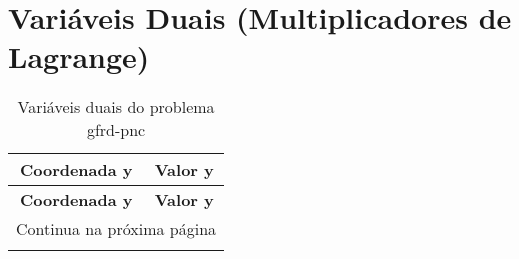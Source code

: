 \documentclass[12pt]{article}
\begin{document}
\section{Variáveis Duais (Multiplicadores de Lagrange)}

\begin{longtable}{@{}cc@{}}
\caption{Variáveis duais do problema gfrd-pnc} \\
\toprule
\textbf{Coordenada y} & \textbf{Valor y} \\
\midrule
\endfirsthead

\toprule
\textbf{Coordenada y} & \textbf{Valor y} \\
\midrule
\endhead

\midrule \multicolumn{2}{r}{{Continua na próxima página}} \\ \midrule
\endfoot


\end{longtable}
\end{document}
